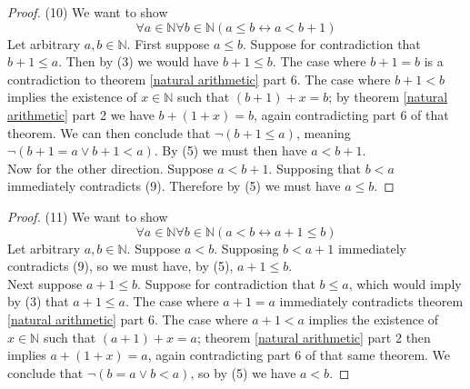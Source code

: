 \documentclass{report}
\begin{document}
\begin{proof}(10)
We want to show
\begin{equation*}
\forall a\in\mathbb N\forall b\in\mathbb N(a\leq b\leftrightarrow a<b+1)
\end{equation*}
Let arbitrary $a,b\in\mathbb N$. First suppose $a\leq b$. Suppose for contradiction that $b+1\leq a$. Then by (3) we would have $b+1\leq b$. The case where $b+1=b$ is a contradiction to
theorem \ref{natural arithmetic} part 6. The case where $b+1<b$ implies the existence of $x\in\mathbb N$ such that $(b+1)+x=b$; by theorem \ref{natural arithmetic} part 2 we have $b+(1+x)=b$, again 
contradicting part 6 of that theorem. We can then conclude
that $\neg(b+1\leq a)$, meaning $\neg(b+1=a\lor b+1<a)$. By (5) we must then have $a<b+1$.\\
\indent Now for the other direction. Suppose $a<b+1$. Supposing that $b<a$ immediately contradicts (9). Therefore by (5) we must have $a\leq b$.
\end{proof}
\begin{proof}(11)
We want to show
\begin{equation*}
\forall a\in\mathbb N\forall b\in\mathbb N(a<b\leftrightarrow a+1\leq b)
\end{equation*}
Let arbitrary $a,b\in\mathbb N$. Suppose $a<b$. Supposing $b<a+1$ immediately contradicts (9), so we must have, by (5), $a+1\leq b$.\\
\indent Next suppose $a+1\leq b$. Suppose for contradiction that 
$b\leq a$, which would imply by (3) that $a+1\leq a$. The case where $a+1=a$ immediately contradicts theorem \ref{natural arithmetic} part 6. The case where $a+1<a$ implies the existence of 
$x\in\mathbb N$ such that $(a+1)+x=a$; theorem \ref{natural arithmetic} part 2 then implies $a+(1+x)=a$, again contradicting part 6 of that same theorem. We conclude that $\neg(b=a\lor b<a)$, so by
(5) we have $a<b$.
\end{proof}
\newpage
\end{document}
